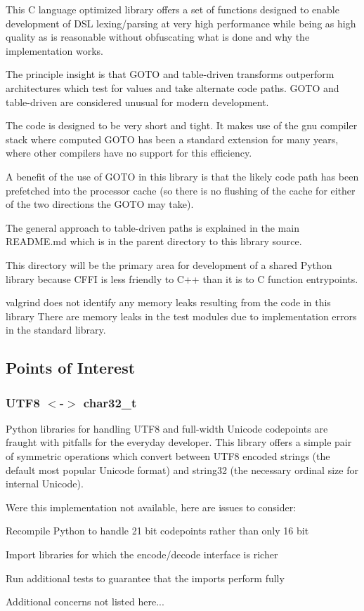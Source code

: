This C language optimized library offers a set of functions designed to enable development of D\+S\+L lexing/parsing at very high performance while being as high quality as is reasonable without obfuscating what is done and why the implementation works.

The principle insight is that G\+O\+T\+O and table-\/driven transforms outperform architectures which test for values and take alternate code paths. G\+O\+T\+O and table-\/driven are considered unusual for modern development.

The code is designed to be very short and tight. It makes use of the gnu compiler stack where computed G\+O\+T\+O has been a standard extension for many years, where other compilers have no support for this efficiency.

A benefit of the use of G\+O\+T\+O in this library is that the likely code path has been prefetched into the processor cache (so there is no flushing of the cache for either of the two directions the G\+O\+T\+O may take).

The general approach to table-\/driven paths is explained in the main R\+E\+A\+D\+M\+E.\+md which is in the parent directory to this library source.

This directory will be the primary area for development of a shared Python library because C\+F\+F\+I is less friendly to C++ than it is to C function entrypoints.

valgrind does not identify any memory leaks resulting from the code in this library There are memory leaks in the test modules due to implementation errors in the standard library.

\subsection*{Points of Interest}

\subsubsection*{U\+T\+F8 $<$-\/$>$ char32\+\_\+t}

Python libraries for handling U\+T\+F8 and full-\/width Unicode codepoints are fraught with pitfalls for the everyday developer. This library offers a simple pair of symmetric operations which convert between U\+T\+F8 encoded strings (the default most popular Unicode format) and string32 (the necessary ordinal size for internal Unicode).

Were this implementation not available, here are issues to consider\+:
\begin{DoxyItemize}
\item Recompile Python to handle 21 bit codepoints rather than only 16 bit
\item Import libraries for which the encode/decode interface is richer
\item Run additional tests to guarantee that the imports perform fully
\item Additional concerns not listed here...
\end{DoxyItemize}

